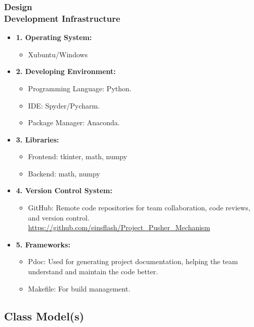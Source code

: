 \documentclass[ucs,10pt]{beamer}
\begin{document}
\begin{frame}
	\frametitle{Design \\
		\small \color{rwth-blue} Development Infrastructure}
	\begin{itemize}
		\item \textbf{1. Operating System:}
		\begin{itemize}
			\item Xubuntu/Windows
		\end{itemize}
		\item \textbf{2. Developing Environment:}
		\begin{itemize}
			\item Programming Language: Python.
			\item IDE: Spyder/Pycharm.
			\item Package Manager: Anaconda.
		\end{itemize}
		\item \textbf{3. Libraries:}
		\begin{itemize}
			\item Frontend: tkinter, math, numpy
			\item Backend: math, numpy
		\end{itemize}
		\item \textbf{4. Version Control System:}
		\begin{itemize}
			\item GitHub: Remote code repositories for team collaboration, code reviews, and version control. \url{https://github.com/einsflash/Project_Pusher_Mechanism}
		\end{itemize}
		\item \textbf{5. Frameworks:}
		\begin{itemize}
			\item Pdoc: Used for generating project documentation, helping the team understand and maintain the code better.
			\item Makefile: For build management.
		\end{itemize}
	\end{itemize}
\end{frame}

\subsection{Class Model(s)}
\end{document}
